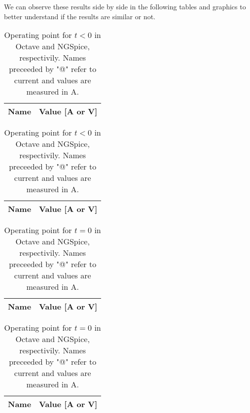 We can observe these results side by side in the following tables and graphics to better understand if the results are similar or not.

\begin{table}[h]
	\centering
	\begin{minipage}[t]{0.33\linewidth}
	 	 \begin{tabular}[t]{|l|r|}
	 	   \hline    
	 	   {\bf Name} & {\bf Value [A or V]} \\ \hline
	 	   
	 	 \end{tabular}
	 	 \label{tab:ct1}
	\end{minipage}
	\begin{minipage}[t]{0.33\linewidth}
	  		\begin{tabular}[t]{|l|r|}
	    	\hline    
	   		{\bf Name} & {\bf Value [A or V]} \\ \hline
	    	
	  		\end{tabular}
	  	\label{tab:cs1}
	\end{minipage}
	  	\caption{Operating point for $t<0$ in Octave and NGSpice, respectivily. Names preceeded by "@" refer to current and values are measured in A.}
\end{table}

\begin{table}[h]
	\centering
	\begin{minipage}[t]{0.33\linewidth}
	 	 \begin{tabular}[t]{|l|r|}
	 	   \hline    
	 	   {\bf Name} & {\bf Value [A or V]} \\ \hline
	 	   
	 	 \end{tabular}
	 	 \label{tab:ct2}
	\end{minipage}
	\begin{minipage}[t]{0.33\linewidth}
	  		\begin{tabular}[t]{|l|r|}
	    	\hline    
	   		{\bf Name} & {\bf Value [A or V]} \\ \hline
	    	
	  		\end{tabular}
	  	\label{tab:cs2}
	\end{minipage}
	  	\caption{Operating point for $t=0$ in Octave and NGSpice, respectivily. Names preceeded by "@" refer to current and values are measured in A.}
\end{table}

\vspace{10cm}
